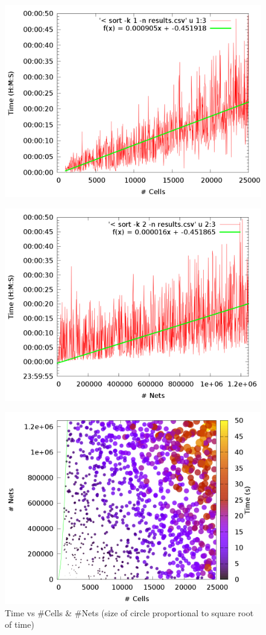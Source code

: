 \documentclass[10pt]{article}
\begin{document}
\begin{figure}[H]
    \centering
    \begin{minipage}{.5\textwidth}
        \centering
        \includegraphics[width=0.8\linewidth]{../tests/result_cells.png}
        \label{fig:test1}
    \end{minipage}%
    \begin{minipage}{.5\textwidth}
        \centering
        \includegraphics[width=0.8\linewidth]{../tests/result_nets.png}
        \label{fig:test2}
    \end{minipage}
\end{figure}

\begin{figure}[H]
    \centering
    \includegraphics[width=0.8\linewidth]{../tests/result_heatmap.png}
    \caption{Time vs \#Cells \& \#Nets (size of circle proportional to square root of time)}
\end{figure}
\end{document}
